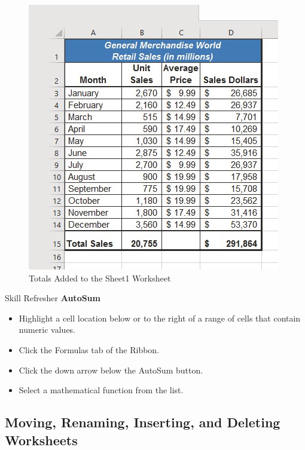 \begin{figure}[H]
	\centering
	\includegraphics[width=\maxwidth{.95\linewidth}]{gfx/ch01_fig46}
	\caption{Totals Added to the Sheet1 Worksheet}
	\label{01:fig46}
\end{figure}

\begin{center}
	\begin{sklbox}{Skill Refresher}
		\textbf{AutoSum}
		\\
		\begin{itemize}
			\setlength{\itemsep}{0pt}
			\setlength{\parskip}{0pt}
			\setlength{\parsep}{0pt}
			
			\item Highlight a cell location below or to the right of a range of cells that contain numeric values.
			\item Click the Formulas tab of the Ribbon.
			\item Click the down arrow below the AutoSum button.
			\item Select a mathematical function from the list.
			
		\end{itemize}
	\end{sklbox}
\end{center}

\subsection{Moving, Renaming, Inserting, and Deleting Worksheets}

